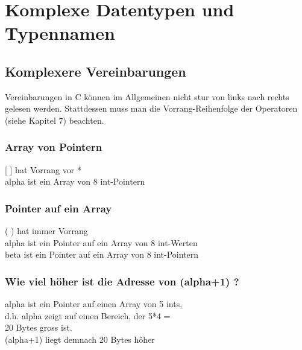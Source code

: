 \section{Komplexe Datentypen und Typennamen}
	\subsection{Komplexere Vereinbarungen}
	 	Vereinbarungen in C können im Allgemeinen nicht stur von links nach rechts gelesen werden. Stattdessen muss man die Vorrang-Reihenfolge der Operatoren (siehe Kapitel 7) beachten.
	 	\subsubsection{Array von Pointern}
			\begin{minipage}[t]{10 cm}
				\vspace*{-0.5cm}
				
			\end{minipage}
			\hspace*{0.5cm}
			\begin{minipage}[t]{10 cm}
				[ ] hat Vorrang vor *\\
				alpha ist ein Array von 8 int-Pointern
			\end{minipage}	 	
	 	\subsubsection{Pointer auf ein Array}
		 	\begin{minipage}[t]{10 cm}
		 		\vspace*{-0.5cm}
		 		
		 	\end{minipage}
		 	\hspace*{0.5cm}
		 	\begin{minipage}[t]{10 cm}
		 		( ) hat immer Vorrang\\
		 		alpha ist ein Pointer auf ein Array von 8 int-Werten\\
		 		beta ist ein Pointer auf ein Array von 8 int-Pointern
		 	\end{minipage}
		\subsubsection{Wie viel höher ist die Adresse von (alpha+1) ?}
			\begin{minipage}[t]{10 cm}
				\vspace*{-0.5cm}
				
			\end{minipage}
			\hspace*{0.5cm}
			\begin{minipage}[t]{10 cm}
				alpha ist ein Pointer auf einen Array von 5 ints,\\ d.h. alpha zeigt auf einen Bereich, der 5*4 =\\ 20 Bytes gross ist.\\ 
				(alpha+1) liegt demnach 20 Bytes höher
			\end{minipage}
